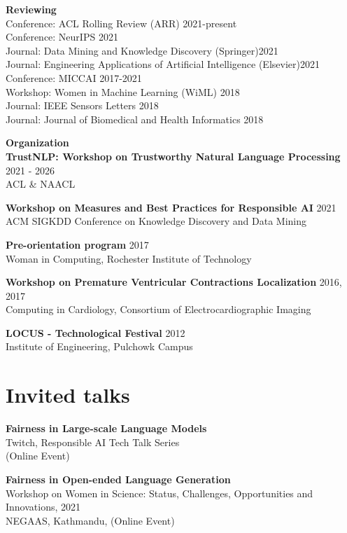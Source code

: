 \documentclass[margin]{res}
\begin{document}
\begin{resume}
\textbf{Reviewing}\\
Conference: ACL Rolling Review (ARR) \hfill 2021-present\\
Conference: NeurIPS \hfill 2021\\
Journal: Data Mining and Knowledge Discovery (Springer)\hfill 2021\\
Journal: Engineering Applications of Artificial Intelligence (Elsevier)\hfill 2021\\
Conference: MICCAI \hfill 2017-2021\\
Workshop: Women in Machine Learning (WiML)  \hfill 2018\\
Journal: IEEE Sensors Letters \hfill 2018\\
Journal: Journal of Biomedical and Health Informatics \hfill 2018

\textbf{Organization}\\
\textbf{TrustNLP: Workshop on Trustworthy Natural Language Processing} \hfill 2021 - 2026\\
{ACL \& NAACL}

\textbf{Workshop on Measures and Best Practices for  Responsible AI} \hfill 2021\\
{ACM SIGKDD Conference on Knowledge Discovery and Data Mining}

\textbf{Pre-orientation program} \hfill 2017\\
{Woman in Computing, Rochester Institute of Technology}

\textbf{Workshop on Premature Ventricular Contractions Localization} \hfill 2016, 2017\\
{Computing in Cardiology, Consortium of Electrocardiographic Imaging}

\textbf{LOCUS - Technological Festival} \hfill 2012\\
{Institute of Engineering, Pulchowk Campus}

\section{Invited talks}
\textbf{Fairness in Large-scale Language Models}\\
{Twitch, Responsible AI Tech Talk Series\\} (Online Event)

\textbf{Fairness in Open-ended Language Generation}\\
{Workshop on Women in Science: Status, Challenges, Opportunities and Innovations, 2021\\} NEGAAS, Kathmandu, (Online Event)


\end{resume}
\end{document}
